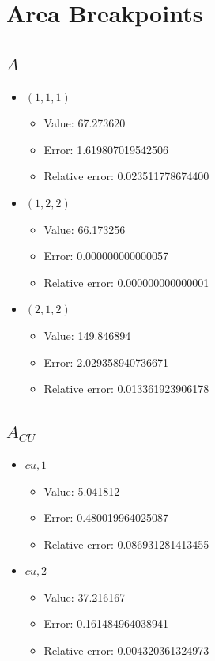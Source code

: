 \documentclass{article}%
\begin{document}
\section{Area Breakpoints}%
\thispagestyle{plain}%
\subsection{$A$}%
\begin{itemize}%
	\item $(1, 1, 1)$%
	\begin{itemize}%
		\item Value: 67.273620%
		\item Error: 1.619807019542506%
		\item Relative error: 0.023511778674400%
	\end{itemize}%
	\item $(1, 2, 2)$%
	\begin{itemize}%
		\item Value: 66.173256%
		\item Error: 0.000000000000057%
		\item Relative error: 0.000000000000001%
	\end{itemize}%
	\item $(2, 1, 2)$%
	\begin{itemize}%
		\item Value: 149.846894%
		\item Error: 2.029358940736671%
		\item Relative error: 0.013361923906178%
	\end{itemize}%
\end{itemize}%
\subsection{$A_{CU}$}%
\begin{itemize}%
	\item $\textit{cu},1$%
	\begin{itemize}%
		\item Value: 5.041812%
		\item Error: 0.480019964025087%
		\item Relative error: 0.086931281413455%
	\end{itemize}%
	\item $\textit{cu},2$%
	\begin{itemize}%
		\item Value: 37.216167%
		\item Error: 0.161484964038941%
		\item Relative error: 0.004320361324973%
	\end{itemize}%
\end{itemize}%
\end{document}
